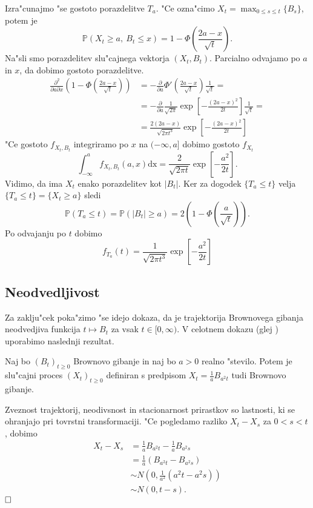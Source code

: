 \documentclass[twoside,11pt]{article}
\begin{document}
Izra"cunajmo "se gostoto porazdelitve $T_a$. "Ce ozna"cimo $X_t = \max_{0\leq s\leq t}\{B_s\}$, potem je 
$$
    \mathbb{P}\left(X_t \geq a, \ B_t \leq x\right) = 1 - \varPhi\left(\frac{2a - x}{\sqrt{t}}\right).
$$
Na"sli smo porazdelitev slu"cajnega vektorja $(X_t, B_t)$. Parcialno odvajamo po $a$ in $x$, da dobimo gostoto porazdelitve. %
\begin{align*}
    \frac{\partial^2}{\partial a \partial x}\left(1 - \varPhi\left(\frac{2a - x}{\sqrt{t}}\right)\right) &= -\frac{\partial}{\partial a}\varPhi'\left(\frac{2a - x}{\sqrt{t}}\right)\frac{1}{\sqrt{t}} =\\
    &= -\frac{\partial}{\partial a}\frac{1}{\sqrt{2\pi}}\exp\left[-\frac{(2a - x)^2}{2t}\right]\frac{1}{\sqrt{t}} =\\
    &= \frac{2(2a - x)}{\sqrt{2\pi t^3}}\exp\left[-\frac{(2a - x)^2}{2t}\right]
\end{align*}
"Ce gostoto $f_{X_t, B_t}$ integriramo  po $x$  na $(-\infty, a]$ dobimo gostoto $f_{X_t}$ 
$$
    \int_{-\infty}^a f_{X_t, B_t}(a, x)\text{dx} = \frac{2}{\sqrt{2\pi t}}\exp\left[-\frac{a^2}{2t}\right].
$$
Vidimo, da ima $X_t$ enako porazdelitev kot $|B_t|$.
Ker za dogodek  $\{T_a \leq t\}$ velja $\{T_a \leq t\} = \{X_t \geq a\}$ sledi 
$$
    \mathbb{P}(T_a \leq t) = \mathbb{P}(|B_t| \geq a) = 2\left(1 - \varPhi\left(\frac{a}{\sqrt{t}}\right)\right).
$$
Po odvajanju po $t$ dobimo
$$
    f_{T_a}(t) = \frac{1}{\sqrt{2\pi t^3}}\exp\left[-\frac{a^2}{2t}\right]
$$

\subsection{Neodvedljivost}
Za zaklju"cek poka"zimo "se idejo dokaza, da je trajektorija Brownovega gibanja neodvedjiva funkcija $t \mapsto B_t$ za vsak $t \in [0, \infty)$. V celotnem dokazu (glej \cite{1}) uporabimo naslednji rezultat.

\begin{lema}
    Naj bo $(B_t)_{t\geq 0}$ Brownovo gibanje in naj bo $a>0$ realno "stevilo. Potem je slu"cajni proces $(X_t)_{t\geq0}$ definiran s predpisom $X_t = \tfrac{1}{a}B_{a^2t}$ tudi Brownovo gibanje.
\end{lema}

\begin{dokaz}
    Zveznost trajektorij, neodivsnost in stacionarnost prirastkov so lastnosti, ki se ohranjajo pri tovrstni transformaciji. "Ce pogledamo razliko $X_t - X_s$ 
    za $0 < s < t$, dobimo
    \begin{align*}
        X_t - X_s &= \tfrac{1}{a}B_{a^2t} - \tfrac{1}{a}B_{a^2s} \\
        &= \tfrac{1}{a}\left(B_{a^2t} - B_{a^2s}\right) \\
       &\sim N\left(0, \tfrac{1}{a^2}(a^2t - a^2s)\right) \\
       &\sim N(0, t-s).
    \end{align*}
    $\hfill \square$
\end{dokaz}
\end{document}
